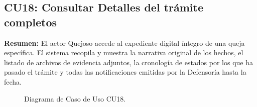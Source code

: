 \begin{appendices}
\newpage

\subsection{CU18: Consultar Detalles del trámite completos}

\textbf{Resumen:} 
El actor Quejoso accede al expediente digital íntegro de una queja específica. El sistema recopila y muestra la narrativa original de los hechos, el listado de archivos de evidencia adjuntos, la cronología de estados por los que ha pasado el trámite y todas las notificaciones emitidas por la Defensoría hasta la fecha.

\begin{figure}[htbp]
    \centering
    \figCUdieciocho
    \caption{Diagrama de Caso de Uso CU18.}
    \label{fig:cu18}
\end{figure}


\end{appendices}
